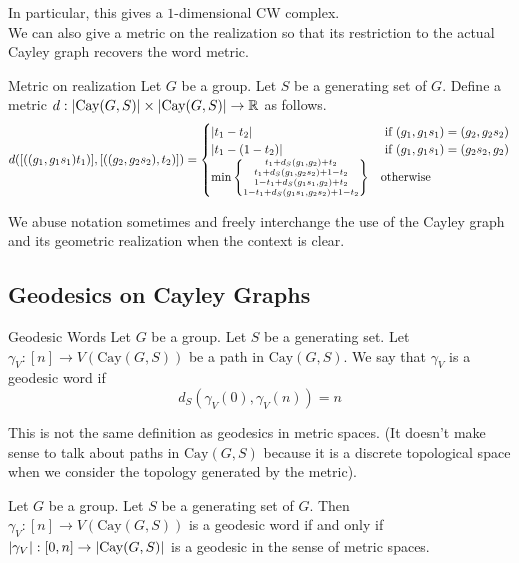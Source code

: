 \documentclass[a4paper]{article}
\begin{document}
In particular, this gives a $1$-dimensional CW complex. \\

We can also give a metric on the realization so that its restriction to the actual Cayley graph recovers the word metric. 

\begin{defn}{Metric on realization}{} Let $G$ be a group. Let $S$ be a generating set of $G$. Define a metric $d:\abs{\text{Cay}(G,S)}\times\abs{\text{Cay}(G,S)}\to\mathbb{R}$ as follows. $$d([((g_1,g_1s_1)t_1)],[((g_2,g_2s_2),t_2)])=\begin{cases}
\abs{t_1-t_2} & \text{ if } (g_1,g_1s_1)=(g_2,g_2s_2)\\
\abs{t_1-(1-t_2)} & \text{ if }(g_1,g_1s_1)=(g_2s_2,g_2)\\
\min\left\{\substack{t_1+d_S(g_1,g_2)+t_2\\t_1+d_S(g_1,g_2s_2)+1-t_2\\1-t_1+d_S(g_1s_1,g_2)+t_2\\1-t_1+d_S(g_1s_1,g_2s_2)+1-t_2}\right\} & \text{otherwise}
\end{cases}$$
\end{defn}

We abuse notation sometimes and freely interchange the use of the Cayley graph and its geometric realization when the context is clear. 

\subsection{Geodesics on Cayley Graphs}
\begin{defn}{Geodesic Words}{} Let $G$ be a group. Let $S$ be a generating set. Let $\gamma_V:[n]\to V(\text{Cay}(G,S))$ be a path in $\text{Cay}(G,S)$. We say that $\gamma_V$ is a geodesic word if $$d_S(\gamma_V(0),\gamma_V(n))=n$$
\end{defn}

This is not the same definition as geodesics in metric spaces. (It doesn't make sense to talk about paths in $\text{Cay}(G,S)$ because it is a discrete topological space when we consider the topology generated by the metric). 

\begin{prp}{}{} Let $G$ be a group. Let $S$ be a generating set of $G$. Then $\gamma_V:[n]\to V(\text{Cay}(G,S))$ is a geodesic word if and only if $\abs{\gamma_V}:[0,n]\to\abs{\text{Cay}(G,S)}$ is a geodesic in the sense of metric spaces. 
\end{prp}
\end{document}
